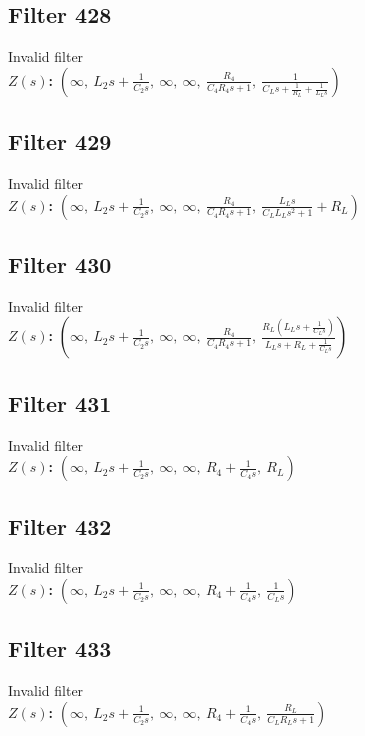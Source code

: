 \documentclass{article}
\begin{document}
\subsection*{Filter 428}
Invalid filter \\ 
\textbf{$Z(s)$:} $\left( \infty, \  L_{2} s + \frac{1}{C_{2} s}, \  \infty, \  \infty, \  \frac{R_{4}}{C_{4} R_{4} s + 1}, \  \frac{1}{C_{L} s + \frac{1}{R_{L}} + \frac{1}{L_{L} s}}\right)$ \\ 
\subsection*{Filter 429}
Invalid filter \\ 
\textbf{$Z(s)$:} $\left( \infty, \  L_{2} s + \frac{1}{C_{2} s}, \  \infty, \  \infty, \  \frac{R_{4}}{C_{4} R_{4} s + 1}, \  \frac{L_{L} s}{C_{L} L_{L} s^{2} + 1} + R_{L}\right)$ \\ 
\subsection*{Filter 430}
Invalid filter \\ 
\textbf{$Z(s)$:} $\left( \infty, \  L_{2} s + \frac{1}{C_{2} s}, \  \infty, \  \infty, \  \frac{R_{4}}{C_{4} R_{4} s + 1}, \  \frac{R_{L} \left(L_{L} s + \frac{1}{C_{L} s}\right)}{L_{L} s + R_{L} + \frac{1}{C_{L} s}}\right)$ \\ 
\subsection*{Filter 431}
Invalid filter \\ 
\textbf{$Z(s)$:} $\left( \infty, \  L_{2} s + \frac{1}{C_{2} s}, \  \infty, \  \infty, \  R_{4} + \frac{1}{C_{4} s}, \  R_{L}\right)$ \\ 
\subsection*{Filter 432}
Invalid filter \\ 
\textbf{$Z(s)$:} $\left( \infty, \  L_{2} s + \frac{1}{C_{2} s}, \  \infty, \  \infty, \  R_{4} + \frac{1}{C_{4} s}, \  \frac{1}{C_{L} s}\right)$ \\ 
\subsection*{Filter 433}
Invalid filter \\ 
\textbf{$Z(s)$:} $\left( \infty, \  L_{2} s + \frac{1}{C_{2} s}, \  \infty, \  \infty, \  R_{4} + \frac{1}{C_{4} s}, \  \frac{R_{L}}{C_{L} R_{L} s + 1}\right)$ \\ 
\end{document}
